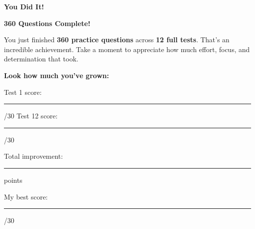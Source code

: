 \clearpage
\thispagestyle{empty}
{\sffamily

\begin{center}
{\fontsize{22}{26}\selectfont\bfseries\color{funTeal} \faTrophy\hspace{3mm}You Did It!\hspace{3mm}\faTrophy}

\vspace{2mm}
{\color{funGray}\hrulefill}
\end{center}

\vspace{3mm}

\begin{tcolorbox}[
    enhanced,
    colback=funTealLight,
    colframe=funTeal!50,
    arc=10pt,
    boxrule=1.5pt,
    left=6mm, right=6mm, top=5mm, bottom=5mm,
]
{\large\bfseries\color{funTealDark} \faCrown\hspace{2mm}360 Questions Complete!}

\vspace{2mm}

You just finished \textbf{360 practice questions} across \textbf{12 full tests}. That's an incredible achievement. Take a moment to appreciate how much effort, focus, and determination that took.

\vspace{3mm}

\textbf{Look how much you've grown:}

\vspace{2mm}

\hspace{3mm}\textcolor{funTeal}{\faStar}\hspace{2mm}Test 1 score: \rule[-2pt]{1.2cm}{0.5pt}/30 \hfill Test 12 score: \rule[-2pt]{1.2cm}{0.5pt}/30

\vspace{2mm}

\hspace{3mm}\textcolor{funTeal}{\faStar}\hspace{2mm}Total improvement: \rule[-2pt]{2cm}{0.5pt} points

\vspace{2mm}

\hspace{3mm}\textcolor{funTeal}{\faStar}\hspace{2mm}My best score: \rule[-2pt]{2cm}{0.5pt}/30

\vspace{2mm}


\end{tcolorbox}}
